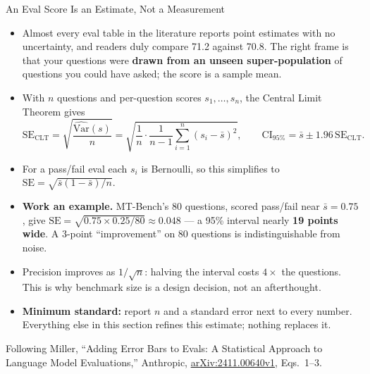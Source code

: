 \begin{frame}[allowframebreaks]{An Eval Score Is an Estimate, Not a Measurement}
  \begin{itemize}\footnotesize\itemsep0.3em
    \item[\textcolor{red}{$\blacktriangleright$}] Almost every eval table in the literature reports point estimates with no uncertainty, and readers duly compare 71.2 against 70.8. The right frame is that your questions were \textbf{drawn from an unseen super-population} of questions you could have asked; the score is a sample mean.
    \item[\textcolor{red}{$\blacktriangleright$}] With $n$ questions and per-question scores $s_1,\dots,s_n$, the Central Limit Theorem gives
      \[
        \mathrm{SE}_{\mathrm{CLT}} = \sqrt{\frac{\widehat{\mathrm{Var}}(s)}{n}}
          = \sqrt{\frac{1}{n} \cdot \frac{1}{n-1}\sum_{i=1}^{n}\left(s_i - \bar{s}\right)^2},
        \qquad
        \mathrm{CI}_{95\%} = \bar{s} \pm 1.96\,\mathrm{SE}_{\mathrm{CLT}}.
      \]
    \item[\textcolor{red}{$\blacktriangleright$}] For a pass/fail eval each $s_i$ is Bernoulli, so this simplifies to $\mathrm{SE} = \sqrt{\bar{s}(1-\bar{s})/n}$.
    \item[\textcolor{red}{$\blacktriangleright$}] \textbf{Work an example.} MT-Bench's 80 questions, scored pass/fail near $\bar{s} = 0.75$, give $\mathrm{SE} = \sqrt{0.75 \times 0.25/80} \approx 0.048$ --- a 95\% interval nearly \textbf{19 points wide}. A 3-point ``improvement'' on 80 questions is indistinguishable from noise.
    \item[\textcolor{red}{$\blacktriangleright$}] Precision improves as $1/\sqrt{n}$: halving the interval costs $4\times$ the questions. This is why benchmark size is a design decision, not an afterthought.
    \item[\textcolor{red}{$\blacktriangleright$}] \textbf{Minimum standard:} report $n$ and a standard error next to every number. Everything else in this section refines this estimate; nothing replaces it.
  \end{itemize}
  \vspace{0.1em}
  {\scriptsize Following Miller, ``Adding Error Bars to Evals: A Statistical Approach to Language Model Evaluations,'' Anthropic, \href{https://arxiv.org/abs/2411.00640v1}{arXiv:2411.00640v1}, Eqs.~1--3.}
\end{frame}

